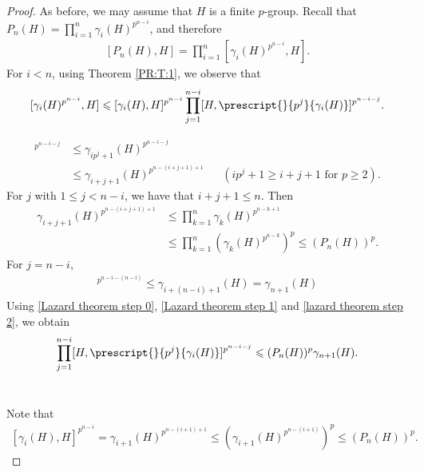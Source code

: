 \documentclass[12pt]{elsarticle}
\newtheorem*{main corollary*}{Main Corollary}
\theoremstyle{definition}
\begin{document}
\begin{proof}
As before, we may assume that $H$ is a finite $p$-group. Recall that $P_n(H)=\prod \limits _{i=1}^n \gamma_i(H)^{p^{n-i}}$, and therefore 
\begin{align}\label{Lazard theorem step -2}
    [P_n(H),H]=\prod \limits _{i=1}^n [\gamma_i(H)^{p^{n-i}},H].
\end{align} For $i < n$, using Theorem \ref{PR:T:1}, we observe that 
\begin{align}\label{Lazard theorem step -1}
    [\gamma_i(H)^{p^{n-i}},H]  \leqslant[\gamma_i(H),H]^{p^{n-i}} \prod \limits _{j=1}^{n-i}[H, \prescript{}{p^{j}}{\gamma_i(H)}]^{p^{n-i-j}}.
\end{align}

\begin{align}
    [H, \prescript{}{p^{j}}{\gamma_i(H)}]^{p^{n-i-j}} &\leqslant \gamma_{ip^j+1}(H)^{p^{n-i-j}}\nonumber \\ 
    &\leqslant \gamma_{i+j+1}(H)^{p^{n-(i+j+1)+1}} && (ip^j+1 \geq i+j+1 \text{ for } p \geq 2)\label{Lazard theorem step 0}.
\end{align}
For $j$ with $1 \leq j < n-i$, we have that $i+j+1 \leq n$. Then 
\begin{align}
    \gamma_{i+j+1}(H)^{p^{n-(i+j+1)+1}} &\leqslant \prod \limits _{k=1}^n \gamma_k(H)^{p^{n-k+1}}\nonumber\\
    &\leqslant\prod \limits _{k=1}^n (\gamma_k(H)^{p^{n-k}})^p\leqslant(P_n(H))^p.\label{Lazard theorem step 1}
\end{align}
For $j=n-i$, 
\begin{align}
    [H, \prescript{}{p^{n-i}}{\gamma_i(H)}]^{p^{n-i-(n-i)}} \leqslant \gamma_{i+(n-i)+1}(H) = \gamma_{n+1}(H)\label{lazard theorem step 2}
\end{align}
Using \eqref{Lazard theorem step 0}, \eqref{Lazard theorem step 1} and \eqref{lazard theorem step 2}, we obtain 
\begin{align}\label{Lazard theorem step 3}
    \prod \limits _{j=1}^{n-i}[H, \prescript{}{p^{j}}{\gamma_i(H)}]^{p^{n-i-j}}\leqslant (P_n(H))^p\gamma_{n+1}(H).
\end{align}\

Note that \begin{align}\label{Lazard theorem step 4}
    [\gamma_i(H),H]^{p^{n-i}} = \gamma_{i+1}(H)^{p^{n-(i+1)+1}}
    \leqslant(\gamma_{i+1}(H)^{p^{n-(i+1)}})^p\leqslant(P_n(H))^p.
\end{align}


\end{proof}
\end{document}
